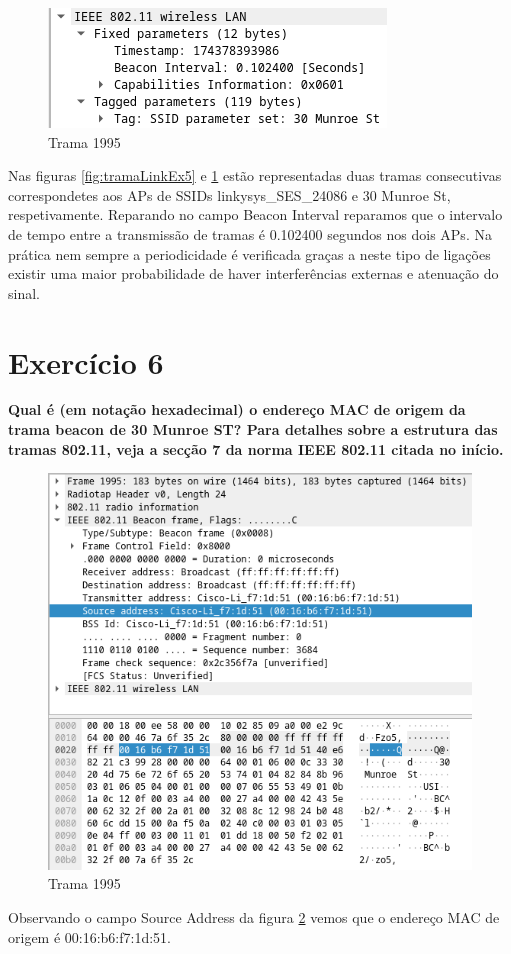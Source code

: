 \documentclass[a4paper]{report}
\begin{document}
\begin{figure}[H]
    \centering 
    \includegraphics[width=\textwidth]{images/tramaMunEx5.png}  
    \caption{Trama 1995}
    \label{fig:tramaMunEx5}
\end{figure}
Nas figuras \ref{fig:tramaLinkEx5} e \ref{fig:tramaMunEx5} estão representadas duas
tramas consecutivas correspondetes aos APs de SSIDs linkysys\_SES\_24086 e 30
Munroe St, respetivamente. Reparando no campo Beacon Interval reparamos que o
intervalo de tempo entre a transmissão de tramas é 0.102400 segundos nos dois APs.
Na prática nem sempre a periodicidade é verificada graças a neste tipo de
ligações existir uma maior probabilidade de haver interferências externas e
atenuação do sinal.

\section{Exercício 6}
\textbf{Qual é (em notação hexadecimal) o endereço MAC de origem da trama beacon
de 30 Munroe ST? Para detalhes sobre a estrutura das tramas 802.11, veja a
secção 7 da norma IEEE 802.11 citada no início.}

\begin{figure}[H]
    \centering 
    \includegraphics[width=\textwidth]{images/tramaEx6.png}  
    \caption{Trama 1995}
    \label{fig:tramaEx6}
\end{figure}
Observando o campo Source Address da figura \ref{fig:tramaEx6} vemos que o
endereço MAC de origem é 00:16:b6:f7:1d:51.
\end{document}

